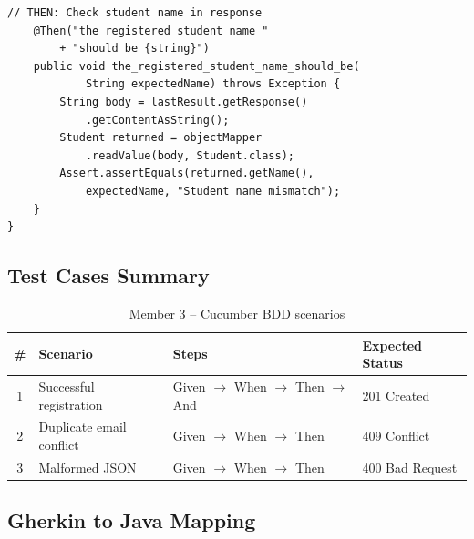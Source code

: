 \documentclass[12pt,a4paper]{article}
\begin{document}
\begin{lstlisting}[style=javastyle, caption={\texttt{StudentSteps.java} -- Cucumber step definitions}]
    // THEN: Check student name in response
    @Then("the registered student name "
        + "should be {string}")
    public void the_registered_student_name_should_be(
            String expectedName) throws Exception {
        String body = lastResult.getResponse()
            .getContentAsString();
        Student returned = objectMapper
            .readValue(body, Student.class);
        Assert.assertEquals(returned.getName(),
            expectedName, "Student name mismatch");
    }
}
\end{lstlisting}

\subsection{Test Cases Summary}

\begin{table}[h!]
\centering
\begin{tabular}{clll}
    \toprule
    \textbf{\#} & \textbf{Scenario} & \textbf{Steps} & \textbf{Expected Status} \\
    \midrule
    1 & Successful registration & Given $\rightarrow$ When $\rightarrow$ Then $\rightarrow$ And & 201 Created \\
    2 & Duplicate email conflict & Given $\rightarrow$ When $\rightarrow$ Then & 409 Conflict \\
    3 & Malformed JSON & Given $\rightarrow$ When $\rightarrow$ Then & 400 Bad Request \\
    \bottomrule
\end{tabular}
\caption{Member 3 -- Cucumber BDD scenarios}
\end{table}

\subsection{Gherkin to Java Mapping}
\end{document}

